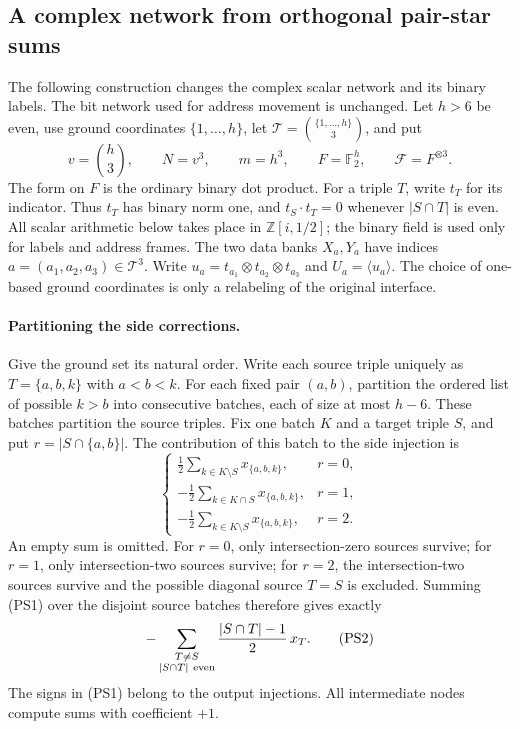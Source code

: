 \subsection{A complex network from orthogonal pair-star sums}
\label{sec:pair-star-complex}
The following construction changes the complex scalar network and its binary
labels.  The bit network used for address movement is unchanged.  Let $h>6$
be even, use ground coordinates $\{1,\ldots,h\}$, let
$\mathcal T=\binom{\{1,\ldots,h\}}3$, and put
\[
 v=\binom h3,\qquad N=v^3,\qquad m=h^3,\qquad
 F=\mathbb F_2^h,\qquad \mathcal F=F^{\otimes3}.
\]
The form on $F$ is the ordinary binary dot product.  For a triple $T$,
write $t_T$ for its indicator.  Thus $t_T$ has binary norm one, and
$t_S\cdot t_T=0$ whenever $|S\cap T|$ is even.  All scalar arithmetic
below takes place in $\mathbb Z[i,1/2]$; the binary field is used only
for labels and address frames.
The two data banks $X_a,Y_a$ have indices
$a=(a_1,a_2,a_3)\in\mathcal T^3$.  Write
$u_a=t_{a_1}\otimes t_{a_2}\otimes t_{a_3}$ and
$U_a=\langle u_a\rangle$.  The choice of one-based ground coordinates
is only a relabeling of the original interface.

\paragraph{Partitioning the side corrections.}
Give the ground set its natural order.  Write each source triple uniquely as
$T=\{a,b,k\}$ with $a<b<k$.  For each fixed pair $(a,b)$, partition the
ordered list of possible $k>b$ into consecutive batches, each of size at
most $h-6$.  These batches partition the source triples.  Fix one batch
$K$ and a target triple $S$, and put $r=|S\cap\{a,b\}|$.  The contribution
of this batch to the side injection is
\[
 \begin{cases}
 \displaystyle\frac12\sum_{k\in K\setminus S}x_{\{a,b,k\}},&r=0,\\[5pt]
 \displaystyle-\frac12\sum_{k\in K\cap S}x_{\{a,b,k\}},&r=1,\\[5pt]
 \displaystyle-\frac12\sum_{k\in K\setminus S}x_{\{a,b,k\}},&r=2.
 \end{cases}                                                    \tag{PS1}
\]
An empty sum is omitted.  For $r=0$, only intersection-zero sources
survive; for $r=1$, only intersection-two sources survive; for $r=2$,
the intersection-two sources survive and the possible diagonal source
$T=S$ is excluded.  Summing (PS1) over the disjoint source batches therefore
gives exactly
\[
 -\sum_{\substack{T\ne S\\ |S\cap T|\ {\rm even}}}
                  \frac{|S\cap T|-1}{2}\,x_T.                    \tag{PS2}
\]
The signs in (PS1) belong to the output injections.  All intermediate
nodes compute sums with coefficient $+1$.


